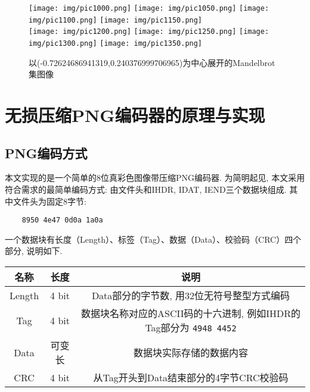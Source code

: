 \documentclass[UTF8]{ctexart}
\begin{document}
\begin{figure}[H]
    \centering
    \vspace{3pt} \texttt{[image: img/pic1000.png]}
    \texttt{[image: img/pic1050.png]}
    \texttt{[image: img/pic1100.png]}
    \texttt{[image: img/pic1150.png]}
    \\
    \centering
    \vspace{3pt} \texttt{[image: img/pic1200.png]}
    \texttt{[image: img/pic1250.png]}
    \texttt{[image: img/pic1300.png]}
    \texttt{[image: img/pic1350.png]}
    \caption{以(-0.72624686941319,0.240376999706965)为中心展开的Mandelbrot集图像}
\end{figure}

\section{无损压缩PNG编码器的原理与实现}

\subsection{PNG编码方式}

本文实现的是一个简单的8位真彩色图像带压缩PNG编码器. 为简明起见, 本文采用符合需求的最简单编码方式: 由文件头和IHDR, IDAT, IEND三个数据块组成. 其中文件头为固定8字节: 

\begin{verbatim}
    8950 4e47 0d0a 1a0a
\end{verbatim}

一个数据块有长度（Length）、标签（Tag）、数据（Data）、校验码（CRC）四个部分, 说明如下.

\begin{table}[H]
    \centering
    \begin{tabular}{|c|c|c|}
        \hline
        \textbf{名称} & \textbf{长度} & \textbf{说明} \\ \hline
        Length & 4 bit & Data部分的字节数, 用32位无符号整型方式编码 \\ \hline
        Tag & 4 bit & 数据块名称对应的ASCII码的十六进制, 例如IHDR的Tag部分为 \verb |4948 4452| \\ \hline
        Data & 可变长 & 数据块实际存储的数据内容 \\ \hline
        CRC & 4 bit & 从Tag开头到Data结束部分的4字节CRC校验码 \\ \hline
    \end{tabular}
\end{table}
\end{document}
